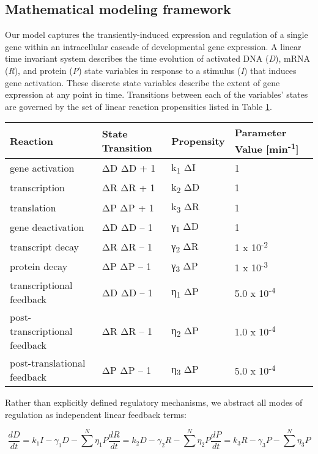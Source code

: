 \subsection{Mathematical modeling framework}
\label{appendix:methods:metabolism:model}

Our model captures the transiently-induced expression and regulation of a single gene within an intracellular cascade of developmental gene expression. A linear time invariant system describes the time evolution of activated DNA (\textit{D}), mRNA (\textit{R}), and protein (\textit{P}) state variables in response to a stimulus (\textit{I}) that induces gene activation. These discrete state variables describe the extent of gene expression at any point in time. Transitions between each of the variables' states are governed by the set of linear reaction propensities listed in Table \ref{appendix:methods:metabolism:tables:rxns}.

\begin{longtable}[]{@{}llll@{}}
\label{appendix:methods:metabolism:tables:rxns}
\toprule
\textbf{Reaction} & \textbf{State Transition} & \textbf{Propensity} & \textbf{Parameter Value {[}min\textsuperscript{-1}{]}}\tabularnewline
\midrule
\endhead
gene activation & ΔD ΔD + 1 & k\textsubscript{1} ΔI & 1\tabularnewline
transcription & ΔR ΔR + 1 & k\textsubscript{2} ΔD & 1\tabularnewline
translation & ΔP ΔP + 1 & k\textsubscript{3} ΔR & 1\tabularnewline
gene deactivation & ΔD ΔD -- 1 & γ\textsubscript{1} ΔD & 1\tabularnewline
transcript decay & ΔR ΔR -- 1 & γ\textsubscript{2} ΔR & 1 x 10\textsuperscript{-2}\tabularnewline
protein decay & ΔP ΔP -- 1 & γ\textsubscript{3} ΔP & 1 x 10\textsuperscript{-3}\tabularnewline
transcriptional feedback & ΔD ΔD -- 1 & η\textsubscript{1} ΔP & 5.0 x 10\textsuperscript{-4}\tabularnewline
post-transcriptional feedback & ΔR ΔR -- 1 & η\textsubscript{2} ΔP & 1.0 x 10\textsuperscript{-4}\tabularnewline
post-translational feedback & ΔP ΔP -- 1 & η\textsubscript{3} ΔP & 5.0 x 10\textsuperscript{-4}\tabularnewline
\bottomrule
\end{longtable}

Rather than explicitly defined regulatory mechanisms, we abstract all modes of regulation as independent linear feedback terms:

\begin{equation}
\frac{dD}{dt}=k_1I-\gamma_1D - \sum\limits_{}^{N} \eta_{1}P
\frac{dR}{dt}=k_2D-\gamma_2R - \sum\limits_{}^{N} \eta_{2}P
\frac{dP}{dt}=k_3R-\gamma_3P - \sum\limits_{}^{N} \eta_{3}P
\end{equation}

